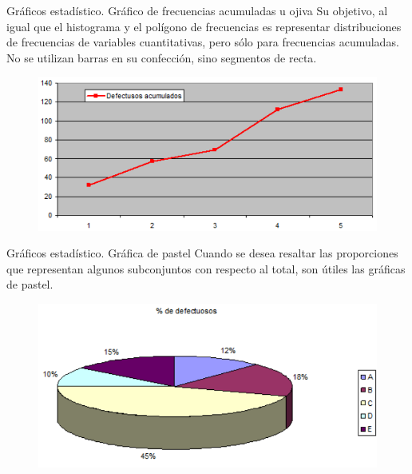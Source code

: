 \documentclass[11pt]{beamer}
\begin{document}
      \begin{frame}{Gráficos estadístico. Gráfico de frecuencias acumuladas u ojiva}
          Su objetivo, al igual que el histograma y el polígono de frecuencias es representar distribuciones de frecuencias de variables cuantitativas, pero sólo para frecuencias acumuladas. No se utilizan barras en su confección, sino segmentos de recta.
          \begin{figure}
              \centering
              \includegraphics[width=0.7\linewidth]{images/graficos_ojiva}
              \label{fig:graficosojiva}
          \end{figure}
      \end{frame}

      \begin{frame}{Gráficos estadístico. Gráfica de pastel}
        Cuando se desea resaltar las proporciones que representan algunos subconjuntos con respecto al total, son útiles las gráficas de pastel.
        \begin{figure}
            \centering
            \includegraphics[width=0.7\linewidth]{images/graficos_pastel}
            \label{fig:graficospastel}
        \end{figure}
      \end{frame}
\end{document}
